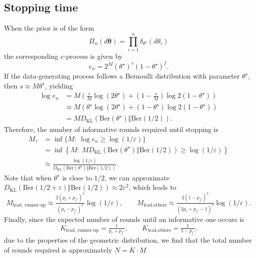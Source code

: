 \subsection{Stopping time}\label{app:subsec_stopping_time}
When the prior is of the form 
$$
\Pi_n(d\bm\theta)=\prod_{i=1}^n\delta_{\theta^\star}(d\theta_i)
$$
the corresponding $e$-process is given by
\[
e_n
= 2^{M}(\theta^\star)^{s}(1-\theta^\star)^{f}.
\] 
If the data-generating process follows a Bernoulli distribution with parameter $\theta^\star$, then $s \approx M \theta^\star$, yielding
\begin{align*}
\log e_{n} &= M \left(\frac{s}{M}\log(2\theta^\star) +\left(1-\frac{s}{M}\right)\log 2(1-\theta^\star)\right)\nonumber\\
&\approx M \left(\theta^\star\log(2\theta^\star) +\left(1-\theta^\star\right)\log 2(1-\theta^\star)\right)\nonumber\\
&=M D_\text{KL}(\text{Ber}(\theta^\star)\Vert \text{Ber}(1/2)).
\end{align*}
Therefore, the number of informative rounds required until stopping is
\begin{align*}
M_\tau &= \inf\{M: \ \log e_n\geq \log(1/\varepsilon)\} \\
&= \inf\left \{M: \ M D_\text{KL}(\text{Ber}(\theta^\star)\Vert \text{Ber}(1/2))\geq \log(1/\varepsilon)\right\} \\
&\approx \frac{\log(1/\varepsilon)}{D_\text{KL}(\text{Ber}(\theta^\star)\Vert \text{Ber}(1/2))}.
\end{align*}
Note that when $\theta^\star$ is close to $1/2$, we can approximate $D_\text{KL}(\text{Ber}(1/2 +\varepsilon)\Vert \text{Ber}(1/2)) \approx 2\varepsilon^2$, which leads to
\small
\begin{equation*}
M_{\text{lead, runner-up}} \approx \tfrac{2\left(p_{\hat{c}} + p_{j^\star}\right)^2}{\left(p_{\hat{c}} - p_{j^\star}\right)^2}\log(1/\varepsilon), \quad\quad M_{\text{lead,others}} \approx \tfrac{2\left(1- p_{j^\star}\right)^2}{\left(2p_{\hat{c}} + p_{j^\star}-1\right)^2}\log(1/\varepsilon).
\end{equation*}
\normalsize
Finally, since the expected number of rounds until an informative one occurs is
\small
\begin{equation*}
K_{\text{lead, runner-up}} = \tfrac{1}{p_{\hat{c}} + p_{j^\star}}, \quad\quad K_{\text{lead,others}} = \tfrac{1}{1- p_{j^\star}}.
\end{equation*}
\normalsize
due to the properties of the geometric distribution, we find that the total number of rounds required is approximately $N = K\cdot M$
